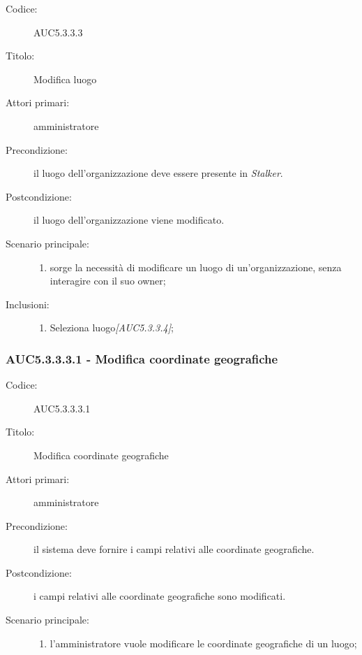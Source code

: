 \documentclass[../../../analisi-dei-requisiti.tex]{subfiles}
\begin{document}
\begin{description}
  \item[Codice:] AUC5.3.3.3
  \item[Titolo:] Modifica luogo
  \item[Attori primari:] amministratore
  \item[Precondizione:] il luogo dell'organizzazione deve essere presente in \emph{Stalker}.
  \item[Postcondizione:] il luogo dell'organizzazione viene modificato.
  \item[Scenario principale:]
  \begin{enumerate}
    \item sorge la necessità di modificare un luogo di un'organizzazione, senza interagire con il suo owner;
  \end{enumerate}
  \item[Inclusioni:]
  \begin{enumerate}
    \item Seleziona luogo\emph{[AUC5.3.3.4]};
  \end{enumerate}
\end{description}

\subsubsection{AUC5.3.3.3.1 - Modifica coordinate geografiche}%
\label{subsub:AUC5.3.3.3.1}
\begin{description}
  \item[Codice:] AUC5.3.3.3.1
  \item[Titolo:] Modifica coordinate geografiche
  \item[Attori primari:] amministratore
  \item[Precondizione:] il sistema deve fornire i campi relativi alle coordinate geografiche.
  \item[Postcondizione:] i campi relativi alle coordinate geografiche sono modificati.
  \item[Scenario principale:]
  \begin{enumerate}
    \item l'amministratore vuole modificare le coordinate geografiche di un luogo;
  \end{enumerate}
\end{description}
\end{document}
